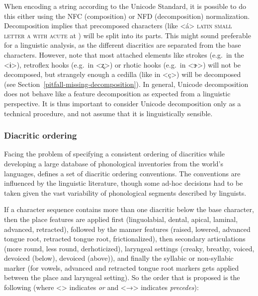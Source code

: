 When encoding a string according to the Unicode Standard, it is possible to do
this either using the NFC (composition) or NFD (decomposition) normalization.
Decomposition implies that precomposed characters (like <á> \textsc{latin small
letter a with acute} at ) will be split into its parts. This might
sound preferable for a linguistic analysis, as the different diacritics are
separated from the base characters. However, note that most attached elements
like strokes (e.g.~in the <ɨ>), retroflex hooks (e.g.~in <ʐ>) or rhotic hooks
(e.g.~in <ɝ>) will not be decomposed, but strangely enough a cedilla (like in
<ç>) will be decomposed (see Section~\ref{pitfall-missing-decomposition}). In
general, Unicode decomposition does not behave like a feature decomposition as
expected from a linguistic perspective. It is thus important to consider Unicode
decomposition only as a technical procedure, and not assume that it is
linguistically sensible.

\subsubsection*{Diacritic ordering}

Facing the problem of specifying a consistent ordering of diacritics while
developing a large database of phonological inventories from the world's
languages, \citet[540]{Moran2012} defines a set of diacritic ordering
conventions. The conventions are influenced by the linguistic literature, though
some ad-hoc decisions had to be taken given the vast variability of phonological segments 
described by linguists. 

If a character sequence contains more than one diacritic below the base
character, then the place features are applied first (linguolabial, dental,
apical, laminal, advanced, retracted), followed by the manner features (raised,
lowered, advanced tongue root, retracted tongue root, frictionalized), then
secondary articulations (more round, less round, derhoticized), laryngeal
settings (creaky, breathy, voiced, devoiced (below), devoiced (above)), and
finally the syllabic or non-syllabic marker (for vowels, advanced and retracted
tongue root markers gets applied between the place and laryngeal setting). So
the order that is proposed is the following (where <\textbar{}> indicates
\textit{or} and <→> indicates \textit{precedes}):

